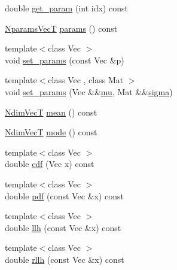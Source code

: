 \begin{DoxyCompactItemize}
\item 
double \hyperlink{classprior__hessian_1_1MultivariateNormalDist_a25c40d83b7b1c09b0a049326c7c7545e}{get\+\_\+param} (int idx) const 
\item 
\hyperlink{classprior__hessian_1_1MultivariateNormalDist_ac690a8a9b00e4e0e159a15bb9c212852}{Nparams\+VecT} \hyperlink{classprior__hessian_1_1MultivariateNormalDist_a55a53ff4ea86375a8971a5334c000c9c}{params} () const 
\item 
{\footnotesize template$<$class Vec $>$ }\\void \hyperlink{classprior__hessian_1_1MultivariateNormalDist_af968e071050a9b2ba4b4ef96b206602b}{set\+\_\+params} (const Vec \&p)
\item 
{\footnotesize template$<$class Vec , class Mat $>$ }\\void \hyperlink{classprior__hessian_1_1MultivariateNormalDist_acd8f1638afb49a52bcb341f3a439574d}{set\+\_\+params} (Vec \&\&\hyperlink{classprior__hessian_1_1MultivariateNormalDist_a53e894d82ca08f285fc004b77301495d}{mu}, Mat \&\&\hyperlink{classprior__hessian_1_1MultivariateNormalDist_aa4e86dd2b8e088553aac8c6b0fa50832}{sigma})
\item 
\hyperlink{classprior__hessian_1_1MultivariateNormalDist_a0f5725cbbfa47be45b2741467dcd5615}{Ndim\+VecT} \hyperlink{classprior__hessian_1_1MultivariateNormalDist_af6e3b749b02b2afafadb01d76f96e334}{mean} () const 
\item 
\hyperlink{classprior__hessian_1_1MultivariateNormalDist_a0f5725cbbfa47be45b2741467dcd5615}{Ndim\+VecT} \hyperlink{classprior__hessian_1_1MultivariateNormalDist_afdec8e6a453a2c69e0d84833d6b3e5ae}{mode} () const 
\item 
{\footnotesize template$<$class Vec $>$ }\\double \hyperlink{classprior__hessian_1_1MultivariateNormalDist_a41f15a93e291cc18bf28c1c0118efa6a}{cdf} (Vec x) const 
\item 
{\footnotesize template$<$class Vec $>$ }\\double \hyperlink{classprior__hessian_1_1MultivariateNormalDist_a67cba536341528564330b17dcbe5faff}{pdf} (const Vec \&x) const 
\item 
{\footnotesize template$<$class Vec $>$ }\\double \hyperlink{classprior__hessian_1_1MultivariateNormalDist_a3540b1bcafd58fe26de858c0a4aef3db}{llh} (const Vec \&x) const 
\item 
{\footnotesize template$<$class Vec $>$ }\\double \hyperlink{classprior__hessian_1_1MultivariateNormalDist_a4512a641c493e33dfb93b5087e473c76}{rllh} (const Vec \&x) const 

\end{DoxyCompactItemize}
